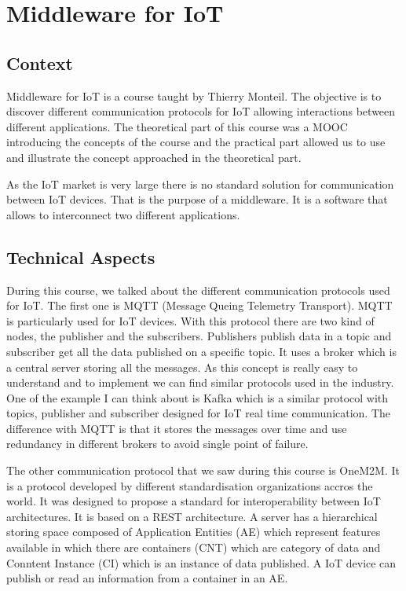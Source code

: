 \section{Middleware for IoT}

\subsection{Context}

Middleware for IoT is a course taught by Thierry Monteil. The objective is to discover different communication protocols for IoT allowing interactions between different applications. The theoretical part of this course was a MOOC introducing the concepts of the course and the practical part allowed us to use and illustrate the concept approached in the theoretical part. 
\\\par
As the IoT market is very large there is no standard solution for communication between IoT devices. That is the purpose of a middleware. It is a software that allows to interconnect two different applications.

\subsection{Technical Aspects}

During this course, we talked about the different communication protocols used for IoT. The first one is MQTT (Message Queing Telemetry Transport). MQTT is particularly used for IoT devices. With this protocol there are two kind of nodes, the publisher and the subscribers. Publishers publish data in a topic and subscriber get all the data published on a specific topic. It uses a broker which is a central server storing all the messages. As this concept is really easy to understand and to implement we can find similar protocols used in the industry. One of the example I can think about is Kafka which is a similar protocol with topics, publisher and subscriber designed for IoT real time communication. The difference with MQTT is that it stores the messages over time and use redundancy in different brokers to avoid single point of failure. 
\\\par

The other communication protocol that we saw during this course is OneM2M. It is a protocol developed by different standardisation organizations accros the world. It was designed to propose a standard for interoperability between IoT architectures. It is based on a REST architecture. A server has a hierarchical storing space composed of Application Entities (AE) which represent features available in which there are containers (CNT) which are category of data and Conntent Instance (CI) which is an instance of data published. A IoT device can publish or read an information from a container in an AE.  

